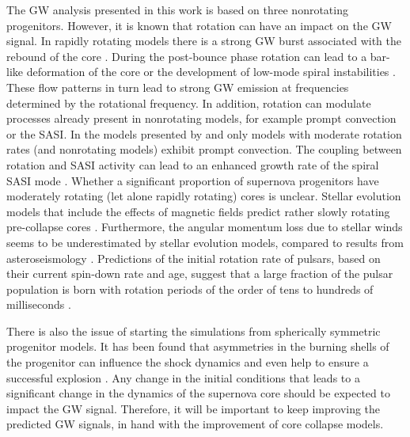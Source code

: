 The GW analysis presented in this work is based on
three nonrotating progenitors.
However, it is known that rotation can have an impact on the
GW signal. In rapidly rotating models there is a strong GW burst
associated with the rebound of the core \citep{mueller_82}.
During the post-bounce phase rotation can lead to a
bar-like deformation of the core \citep{rampp_98,shibata_05} or the development
of low-mode spiral instabilities \citep{ott_05,kuroda_14,takiwaki_16}.
These flow patterns in turn lead to strong GW emission at frequencies 
determined by the rotational frequency.
In addition, rotation can modulate processes
already present in nonrotating models, for example prompt convection or the SASI. 
In the models presented by \citet{dimmelmeier_08} and \citet{ott_12}
only models with moderate rotation rates (and nonrotating models) exhibit prompt convection.
The coupling between rotation and SASI activity can lead to an enhanced growth 
rate of the spiral SASI mode \citep{blondin_07a,yamasaki_08,iwakami_09,kazeroni_16,janka_16}. 
Whether a significant proportion of supernova progenitors have moderately rotating (let alone rapidly rotating) cores is unclear. 
Stellar evolution models that include the effects of magnetic fields predict rather slowly rotating
pre-collapse cores \citep{heger_05}. Furthermore, the angular momentum loss due to stellar winds 
seems to be underestimated by stellar evolution models, compared to results from asteroseismology \citep{cantiello_14}.
Predictions of the initial rotation rate of pulsars, based on their current
spin-down rate and age, suggest that a large fraction of the pulsar population is born 
with rotation periods of the order of tens to hundreds of milliseconds \citep{popov_12,noutsos_13}. 

There is also the issue of starting the simulations from spherically symmetric progenitor models.
It has been found that asymmetries in the burning shells of the progenitor can 
influence the shock dynamics and even help to ensure a
successful explosion \citep{burrows_96,fryer_04,arnett_11,couch_13,mueller_15a}. Any change
in the initial conditions that leads to a significant change in the dynamics of the
supernova core should be expected to impact the GW signal. Therefore, it will 
be important to keep improving the predicted GW signals, in hand with the improvement of
core collapse models.

